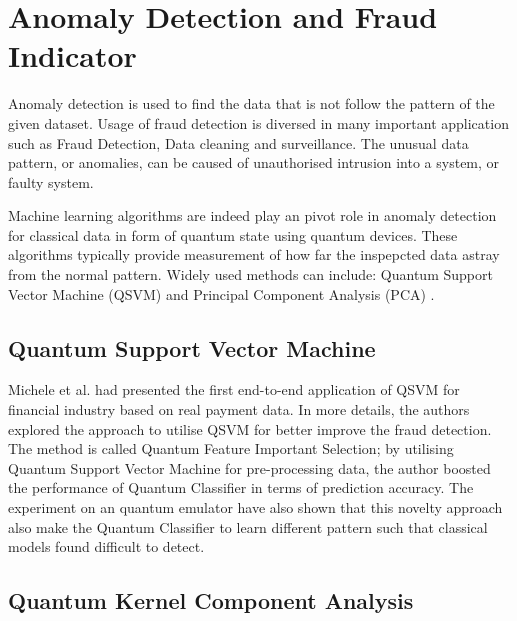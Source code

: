 \section{Anomaly Detection and Fraud Indicator} \label{Sec: Anomaly Detection and Fraud Indicator}

Anomaly detection is used to find the data that is not follow the pattern of the given dataset.
Usage of fraud detection is diversed in many important application such as Fraud Detection, Data cleaning and surveillance.
The unusual data pattern, or anomalies, can be caused of unauthorised intrusion into a system, or faulty system.

Machine learning algorithms are indeed play an pivot role in anomaly detection for classical data in form of quantum state using quantum devices.
These algorithms typically provide measurement of how far the inspepcted data astray from the normal pattern.
Widely used methods can include: Quantum Support Vector Machine (QSVM) \cite{grossiMixedQuantumClassical2022,kyriienkoUnsupervisedQuantumMachine2022} and Principal Component Analysis (PCA) \cite{lloydQuantumPrincipalComponent2014}.

\subsection{Quantum Support Vector Machine}
Michele et al. \cite{grossiMixedQuantumClassical2022} had presented the first end-to-end application of QSVM for financial industry based on real payment data.
In more details, the authors explored the approach to utilise QSVM for better improve the fraud detection.
The method is called Quantum Feature Important Selection; by utilising Quantum Support Vector Machine for pre-processing data, the author boosted the performance of Quantum Classifier in terms of prediction accuracy.
The experiment on an quantum emulator have also shown that this novelty approach also make the Quantum Classifier to learn different pattern such that classical models found difficult to detect.

\subsection{Quantum Kernel Component Analysis}

